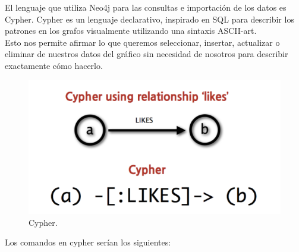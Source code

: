 \documentclass[12pt,a4paper]{article}
\begin{document}
		El lenguaje que utiliza Neo4j para las consultas e importación de los datos es Cypher.
		Cypher es un lenguaje declarativo, inspirado en SQL para describir los patrones en los grafos visualmente utilizando una sintaxis ASCII-art.\\
		
		Esto nos permite afirmar lo que queremos seleccionar, insertar, actualizar o eliminar de nuestros datos del gráfico sin necesidad de nosotros para describir exactamente cómo hacerlo.
		
		\begin{figure}[tbph!]
			\centering
			\includegraphics[width=0.5\linewidth]{images/cypher}
			\caption{Cypher.}
			\label{fig:Cypher}
		\end{figure}
		
		Los comandos en cypher serían los siguientes:
		
\end{document}
